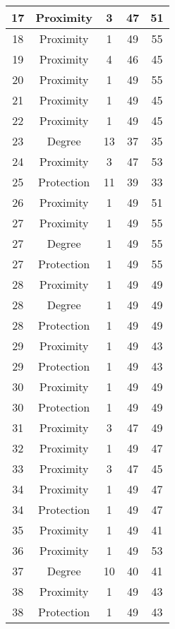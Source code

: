 \documentclass[results.tex]{subfiles}
\begin{document}
\begin{center}
\begin{tabular}{| c || c | c | c | c |}
    17 & Proximity & 3 & 47 & 51 \\ 
    \hline
    18 & Proximity & 1 & 49 & 55 \\ 
    \hline
    19 & Proximity & 4 & 46 & 45 \\ 
    \hline
    20 & Proximity & 1 & 49 & 55 \\ 
    \hline
    21 & Proximity & 1 & 49 & 45 \\ 
    \hline
    22 & Proximity & 1 & 49 & 45 \\ 
    \hline
    23 & Degree & 13 & 37 & 35 \\ 
    \hline
    24 & Proximity & 3 & 47 & 53 \\ 
    \hline
    25 & Protection & 11 & 39 & 33 \\ 
    \hline
    26 & Proximity & 1 & 49 & 51 \\ 
    \hline
    27 & Proximity & 1 & 49 & 55 \\ 
    \hline
    27 & Degree & 1 & 49 & 55 \\ 
    \hline
    27 & Protection & 1 & 49 & 55 \\ 
    \hline
    28 & Proximity & 1 & 49 & 49 \\ 
    \hline
    28 & Degree & 1 & 49 & 49 \\ 
    \hline
    28 & Protection & 1 & 49 & 49 \\ 
    \hline
    29 & Proximity & 1 & 49 & 43 \\ 
    \hline
    29 & Protection & 1 & 49 & 43 \\ 
    \hline
    30 & Proximity & 1 & 49 & 49 \\ 
    \hline
    30 & Protection & 1 & 49 & 49 \\ 
    \hline
    31 & Proximity & 3 & 47 & 49 \\ 
    \hline
    32 & Proximity & 1 & 49 & 47 \\ 
    \hline
    33 & Proximity & 3 & 47 & 45 \\ 
    \hline
    34 & Proximity & 1 & 49 & 47 \\ 
    \hline
    34 & Protection & 1 & 49 & 47 \\ 
    \hline
    35 & Proximity & 1 & 49 & 41 \\ 
    \hline
    36 & Proximity & 1 & 49 & 53 \\ 
    \hline
    37 & Degree & 10 & 40 & 41 \\ 
    \hline
    38 & Proximity & 1 & 49 & 43 \\ 
    \hline
    38 & Protection & 1 & 49 & 43 \\ 

\end{tabular}
\end{center}
\end{document}
